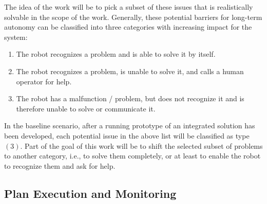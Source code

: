 \documentclass[english, master, expose, utf8]{base/thesis_KBS}
\begin{document}
The idea of the work will be to pick a subset of these issues that is realistically solvable in the scope of the work.
Generally, these potential barriers for long-term autonomy can be classified into three categories with increasing impact for the system:
\begin{enumerate}
    \item The robot recognizes a problem and is able to solve it by itself.
    \item The robot recognizes a problem, is unable to solve it, and calls a human operator for help.
    \item The robot has a malfunction / problem, but does not recognize it and is therefore unable to solve or communicate it.
\end{enumerate}

In the baseline scenario, after a running prototype of an integrated solution has been developed, each potential issue in the above list will be classified as type $(3)$.
Part of the goal of this work will be to shift the selected subset of problems to another category, i.e., to solve them completely, 
or at least to enable the robot to recognize them and ask for help.

\subsection{Plan Execution and Monitoring}
\end{document}
